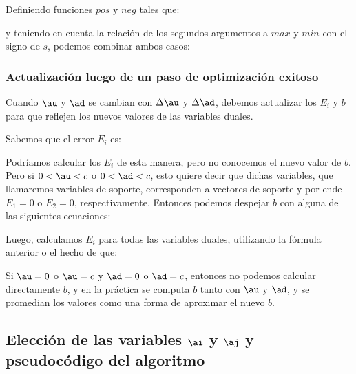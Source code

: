 
Definiendo funciones $pos$ y $neg$ tales que:


y teniendo en cuenta la relación de los segundos argumentos a $max$ y $min$ con el signo de $s$, podemos combinar ambos casos: 



\subsubsection{Actualización luego de un paso de optimización exitoso}

Cuando $\au$ y $\ad$ se cambian con $\Delta \au$ y $\Delta \ad$, debemos actualizar los $E_i$ y $b$ para que reflejen los nuevos valores de las variables duales.

Sabemos que el error $E_i$ es:


Podríamos calcular los $E_i$ de esta manera, pero no conocemos el nuevo valor de $b$. Pero si $0 < \au < c$ o $0 < \ad < c$, esto quiere decir que dichas variables, que llamaremos variables de soporte, corresponden a vectores de soporte y por ende $E_1=0$ o $E_2=0$, respectivamente. Entonces podemos despejar $b$ con alguna de las siguientes ecuaciones:


Luego, calculamos $E_i$ para todas las variables duales, utilizando la fórmula anterior o el hecho de que:


Si $\au=0$ o $\au=c$ y $\ad = 0$ o $\ad = c$, entonces no podemos calcular directamente $b$, y en la práctica se computa $b$ tanto con $\au$ y $\ad$, y se promedian los valores como una forma de aproximar el nuevo $b$. 

\subsection{Elección de las variables $\ai$ y $\aj$ y pseudocódigo del algoritmo}

